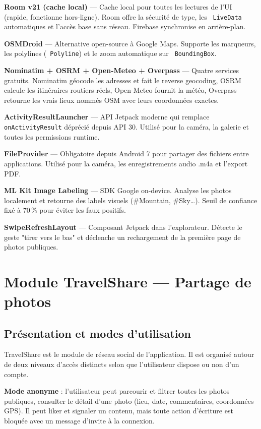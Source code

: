 \documentclass[a4paper,12pt,openany]{report}
\newcommand{\ic}[1]{\texttt{\small\colorbox{lightbg}{\color{navy!90} #1}}}
\begin{document}
\textbf{Room v21 (cache local)} — Cache local pour toutes les lectures de l'UI (rapide,
fonctionne hors-ligne). Room offre la sécurité de type, les \ic{LiveData} automatiques
et l'accès base sans réseau. Firebase synchronise en arrière-plan.

\textbf{OSMDroid} — Alternative open-source à Google Maps.
Supporte les marqueurs, les polylines (\ic{Polyline}) et le zoom automatique sur
\ic{BoundingBox}.

\textbf{Nominatim + OSRM + Open-Meteo + Overpass} — Quatre services gratuits. Nominatim géocode les adresses et fait le reverse geocoding,
OSRM calcule les itinéraires routiers réels, Open-Meteo fournit la météo, Overpass
retourne les vrais lieux nommés OSM avec leurs coordonnées exactes.

\textbf{ActivityResultLauncher} — API Jetpack moderne qui remplace
\ic{onActivityResult} déprécié depuis API 30. Utilisé pour la caméra, la galerie et
toutes les permissions runtime.

\textbf{FileProvider} — Obligatoire depuis Android 7 pour partager des fichiers entre
applications. Utilisé pour la caméra, les enregistrements audio .m4a et l'export PDF.

\textbf{ML Kit Image Labeling} — SDK Google on-device. Analyse
les photos localement et retourne des labels visuels (\#Mountain, \#Sky…). Seuil de
confiance fixé à 70\,\% pour éviter les faux positifs.

\textbf{SwipeRefreshLayout} — Composant Jetpack dans l'explorateur. Détecte le geste
"tirer vers le bas" et déclenche un rechargement de la première page de photos publiques.


\chapter{Module TravelShare — Partage de photos}

\section{Présentation et modes d'utilisation}

TravelShare est le module de réseau social de l'application. Il est organisé
autour de deux niveaux d'accès distincts selon que l'utilisateur dispose ou
non d'un compte.

\textbf{Mode anonyme} : l'utilisateur peut parcourir et filtrer toutes les
photos publiques, consulter le détail d'une photo (lieu, date, commentaires,
coordonnées GPS). Il peut liker et signaler un contenu, mais toute action
d'écriture est bloquée avec un message d'invite à la connexion.
\end{document}
